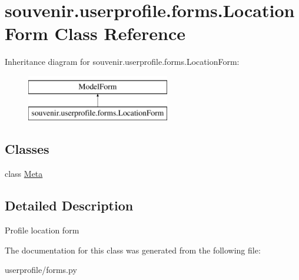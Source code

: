 \hypertarget{classsouvenir_1_1userprofile_1_1forms_1_1LocationForm}{\section{souvenir.\-userprofile.\-forms.\-Location\-Form Class Reference}
\label{classsouvenir_1_1userprofile_1_1forms_1_1LocationForm}
}
Inheritance diagram for souvenir.\-userprofile.\-forms.\-Location\-Form\-:\begin{figure}[H]
\begin{center}
\leavevmode
\includegraphics[height=2.000000cm]{classsouvenir_1_1userprofile_1_1forms_1_1LocationForm}
\end{center}
\end{figure}
\subsection*{Classes}
\begin{DoxyCompactItemize}
\item 
class \hyperlink{classsouvenir_1_1userprofile_1_1forms_1_1LocationForm_1_1Meta}{Meta}
\end{DoxyCompactItemize}


\subsection{Detailed Description}
\begin{DoxyVerb}Profile location form
\end{DoxyVerb}
 

The documentation for this class was generated from the following file\-:\begin{DoxyCompactItemize}
\item 
userprofile/forms.\-py\end{DoxyCompactItemize}
